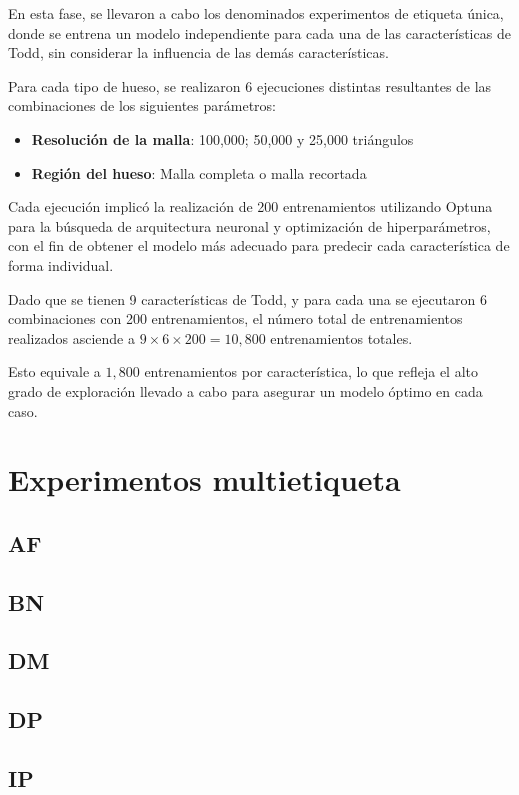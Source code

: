 En esta fase, se llevaron a cabo los denominados experimentos de etiqueta única, donde se entrena un modelo independiente para cada una de las características de Todd, sin considerar la influencia de las demás características.

Para cada tipo de hueso, se realizaron 6 ejecuciones distintas resultantes de las combinaciones de los siguientes parámetros:

\begin{itemize}
\item \textbf{Resolución de la malla}: 100,000; 50,000 y 25,000 triángulos
\item \textbf{Región del hueso}: Malla completa o malla recortada
\end{itemize}

Cada ejecución implicó la realización de 200 entrenamientos utilizando Optuna para la búsqueda de arquitectura neuronal y optimización de hiperparámetros, con el fin de obtener el modelo más adecuado para predecir cada característica de forma individual.

Dado que se tienen 9 características de Todd, y para cada una se ejecutaron 6 combinaciones con 200 entrenamientos, el número total de entrenamientos realizados asciende a $9\times6\times200=10,800$ entrenamientos totales.

Esto equivale a $1,800$ entrenamientos por característica, lo que refleja el alto grado de exploración llevado a cabo para asegurar un modelo óptimo en cada caso.



\section{Experimentos multietiqueta}

\subsection{AF}
\subsection{BN}
\subsection{DM}
\subsection{DP}
\subsection{IP}

